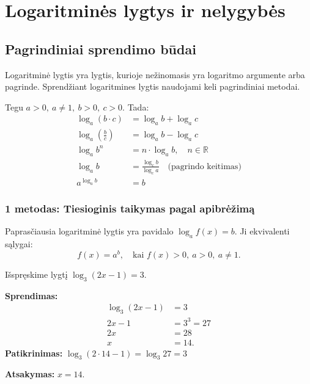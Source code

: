 \section{Logaritminės lygtys ir nelygybės}

\subsection{Pagrindiniai sprendimo būdai}

Logaritminė lygtis yra lygtis, kurioje nežinomasis yra logaritmo argumente arba pagrinde. Sprendžiant logaritmines lygtis naudojami keli pagrindiniai metodai.

\begin{tcolorbox}[title={Svarbiausios logaritmų savybės (priminimai)}]
Tegu $a > 0,\ a \neq 1,\ b > 0,\ c > 0$. Tada:
\begin{align}
\log_a(b \cdot c) &= \log_a b + \log_a c \\
\log_a\!\left(\frac{b}{c}\right) &= \log_a b - \log_a c \\
\log_a b^n &= n \cdot \log_a b,\quad n \in \mathbb{R} \\
\log_a b &= \frac{\log_c b}{\log_c a} \quad \text{(pagrindo keitimas)} \\
a^{\log_a b} &= b
\end{align}
\end{tcolorbox}

\subsubsection*{1 metodas: Tiesioginis taikymas pagal apibrėžimą}

Paprasčiausia logaritminė lygtis yra pavidalo $\log_a f(x) = b$. Ji ekvivalenti sąlygai:
\[
f(x) = a^b, \quad \text{kai } f(x) > 0,\ a > 0,\ a \neq 1.
\]

\begin{example}
Išspręskime lygtį $\log_3(2x - 1) = 3$.

\textbf{Sprendimas:}
\begin{align*}
\log_3(2x - 1) &= 3 \\
2x - 1 &= 3^3 = 27 \\
2x &= 28 \\
x &= 14.
\end{align*}
\textbf{Patikrinimas:} $\log_3(2 \cdot 14 - 1) = \log_3 27 = 3$ \checkmark

\textbf{Atsakymas:} $x = 14$.
\end{example}

